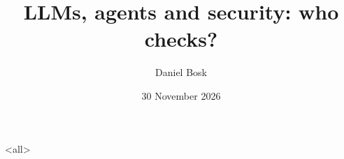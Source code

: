 \documentclass[ignoreframetext]{beamer}
\begin{document}
\title{%
  LLMs, agents and security: who checks?
}
\author{Daniel Bosk}
\date{30 November 2026}

\begin{frame}
  \maketitle
\end{frame}

\mode<all>

\mode*
%
\end{document}
